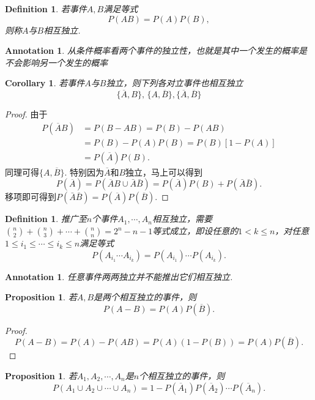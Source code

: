 \documentclass{article}
\newtheorem{corollary}[theorem]{Corollary}
\newtheorem{proposition}[theorem]{Proposition}
\newtheorem{definition}[theorem]{Definition}
\newtheorem{annotation}[theorem]{Annotation}
\begin{document}
\begin{definition}
\rm 若事件$A,B$满足等式
$$
P(AB) = P(A)P(B),
$$
则称$A$与$B${\color{red}相互独立}. 
\end{definition}

\begin{annotation}
\rm {\color{blue} 从条件概率看两个事件的独立性，也就是其中一个发生的概率是不会影响另一个发生的概率}
\end{annotation}

\begin{corollary}
\rm 若事件$A$与$B$独立，则下列各对立事件也相互独立
$$
\{\overline{A}, B\},\, \{A,\overline{B}\}, \{\overline{A},\overline{B}\}
$$
\end{corollary}

\begin{proof}
由于
$$
\begin{array}{ll}
P(\overline{A}B) &= P(B-AB)=P(B)-P(AB)\\
&= P(B)-P(A)P(B) = P(B)[1-P(A)]\\
&= P(\overline{A})P(B).  
\end{array}
$$
同理可得$\{A,\overline{B}\}$. 特别因为$\overline{A}$和$B$独立，马上可以得到
$$
P(\overline{A}) = P(\overline{A}B \cup \bar{A}\bar{B}) = P(\overline{A})P(B) + P(\bar{A}\bar{B}). 
$$
移项即可得到$P(\bar{A}\bar{B}) = P(\overline{A})P(\overline{B})$. 
\end{proof}

\begin{definition}
\rm 推广至$n$个事件$A_1,\cdots,A_n$相互独立，需要$\binom n2 + \binom n3 + \cdots + \binom nn = 2^n - n -1$等式成立，即设任意的$1<k \leq n$，对任意$1 \leq i_1 \leq \cdots \leq i_k \leq n$满足等式
$$
P(A_{i_1}\cdots A_{i_k})=P(A_{i_1})\cdots P(A_{i_k}).
$$
\end{definition}

\begin{annotation}
\rm {\color{blue}任意事件两两独立并不能推出它们相互独立}.
\end{annotation}

\begin{proposition}
\rm 若$A,B$是两个相互独立的事件，则
$$
P(A-B) = P(A)P(\overline{B}).
$$
\end{proposition}

\begin{proof}
\rm 
$$
P(A-B) = P(A)-P(AB) = P(A)(1-P(B)) = P(A)P(\overline{B}).
$$
\end{proof}

\begin{proposition}
\rm 若$A_1,A_2,\cdots,A_n$是$n$个相互独立的事件，则
$$
P(A_1 \cup A_2 \cup \cdots \cup A_n) = 1-P(\overline{A}_1)P(\overline{A}_2)\cdots P(\overline{A}_n). 
$$
\end{proposition}
\end{document}
